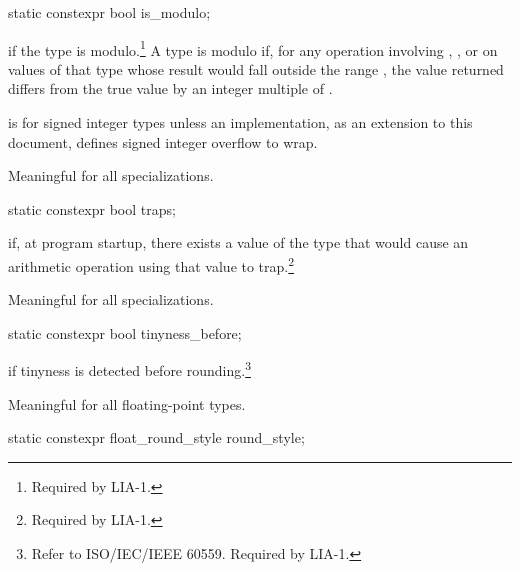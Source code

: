 %
\begin{itemdecl}
static constexpr bool is_modulo;
\end{itemdecl}

\begin{itemdescr}
\pnum
{} if the type is modulo.\footnote{Required by LIA-1.}
A type is modulo if, for any operation involving \tcode{+}, \tcode{-}, or
\tcode{*} on values of that type whose result would fall outside the range
, the value returned differs from the true value by an
integer multiple of .

\pnum
\begin{example}
 is  for signed integer types
unless an implementation, as an extension to this document,
defines signed integer overflow to wrap.
\end{example}

\pnum
Meaningful for all specializations.
\end{itemdescr}

%
\begin{itemdecl}
static constexpr bool traps;
\end{itemdecl}

\begin{itemdescr}
\pnum
{}
if, at program startup, there exists a value of the type that would cause
an arithmetic operation using that value to trap.\footnote{Required by LIA-1.}

\pnum
Meaningful for all specializations.
\end{itemdescr}

%
\begin{itemdecl}
static constexpr bool tinyness_before;
\end{itemdecl}

\begin{itemdescr}
\pnum
{}
if tinyness is detected before rounding.\footnote{Refer to
ISO/IEC/IEEE 60559.
Required by LIA-1.}

\pnum
Meaningful for all floating-point types.
\end{itemdescr}

%
\begin{itemdecl}
static constexpr float_round_style round_style;
\end{itemdecl}

